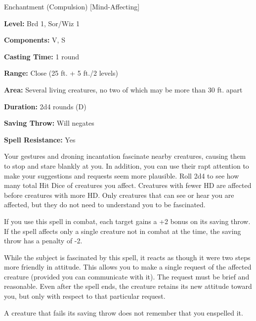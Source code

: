 
Enchantment (Compulsion) [Mind-Affecting]

\textbf{Level:} Brd 1, Sor/Wiz 1

\textbf{Components:} V, S

\textbf{Casting Time:} 1 round

\textbf{Range:} Close (25 ft. + 5 ft./2 levels)

\textbf{Area:} Several living creatures, no two of which may be more than 30 ft. 
apart

\textbf{Duration:} 2d4 rounds (D)

\textbf{Saving Throw:} Will negates

\textbf{Spell Resistance:} Yes

Your gestures and droning incantation fascinate nearby creatures, causing them 
to stop and stare blankly at you. In addition, you can use their rapt attention 
to make your suggestions and requests seem more plausible. Roll 2d4 to see how 
many total Hit Dice of creatures you affect. Creatures with fewer HD are affected 
before creatures with more HD. Only creatures that can see or hear you are affected, 
but they do not need to understand you to be fascinated.

If you use this spell in combat, each target gains a +2 bonus on its saving throw. 
If the spell affects only a single creature not in combat at the time, the saving 
throw has a penalty of -2.

While the subject is fascinated by this spell, it reacts as though it were two 
steps more friendly in attitude. This allows you to make a single request of the 
affected creature (provided you can communicate with it). The request must be brief 
and reasonable. Even after the spell ends, the creature retains its new attitude 
toward you, but only with respect to that particular request.

A creature that fails its saving throw does not remember that you enspelled it.

